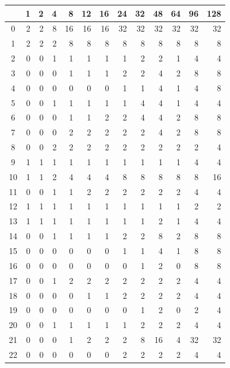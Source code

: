 \documentclass[11pt,a4paper,openright,twoside]{book}
\numberwithin{equation}{section} %
\numberwithin{figure}{section} %
\numberwithin{table}{section} %
\begin{document}
\begin{table}[ht]
	\centering
	\small
	\def\arraystretch{0.85}
	\begin{tabular}{c|rrrrrrrrrrrr}
		\diagbox{\acs{IPM}}{System} &
		1 & 2 & 4 & 8  & 12 & 16 & 24 & 32 & 48 & 64 & 96 & 128 \\
		\hline
		0 & 2 & 2 & 8 & 16 & 16 & 16 & 32 & 32 & 32 & 32 & 32 & 32 \\
		1 & 2 & 2 & 2 & 8  & 8  & 8  & 8  & 8  & 8  & 8  & 8  & 8 \\
		2 & 0 & 0 & 1 & 1  & 1  & 1  & 1  & 2  & 2  & 1  & 4  & 4 \\
		3 & 0 & 0 & 0 & 1  & 1  & 1  & 2  & 2  & 4  & 2  & 8  & 8 \\
		4 & 0 & 0 & 0 & 0  & 0  & 0  & 1  & 1  & 4  & 1  & 4  & 8 \\
		5 & 0 & 0 & 1 & 1  & 1  & 1  & 1  & 4  & 4  & 1  & 4  & 4 \\
		6 & 0 & 0 & 0 & 1  & 1  & 2  & 2  & 4  & 4  & 2  & 8  & 8 \\
		7 & 0 & 0 & 0 & 2  & 2  & 2  & 2  & 2  & 4  & 2  & 8  & 8 \\
		8 & 0 & 0 & 2 & 2  & 2  & 2  & 2  & 2  & 2  & 2  & 2  & 4 \\
		9 & 1 & 1 & 1 & 1  & 1  & 1  & 1  & 1  & 1  & 1  & 4  & 4 \\
		10 & 1 & 1 & 2 & 4  & 4  & 4  & 8  & 8  & 8  & 8  & 8  & 16 \\
		11 & 0 & 0 & 1 & 1  & 2  & 2  & 2  & 2  & 2  & 2  & 4  & 4 \\
		12 & 1 & 1 & 1 & 1  & 1  & 1  & 1  & 1  & 1  & 1  & 2  & 2 \\
		13 & 1 & 1 & 1 & 1  & 1  & 1  & 1  & 1  & 2  & 1  & 4  & 4 \\
		14 & 0 & 0 & 1 & 1  & 1  & 1  & 2  & 2  & 8  & 2  & 8  & 8 \\
		15 & 0 & 0 & 0 & 0  & 0  & 0  & 1  & 1  & 4  & 1  & 8  & 8 \\
		16 & 0 & 0 & 0 & 0  & 0  & 0  & 0  & 1  & 2  & 0  & 8  & 8 \\
		17 & 0 & 0 & 1 & 2  & 2  & 2  & 2  & 2  & 2  & 2  & 4  & 4 \\
		18 & 0 & 0 & 0 & 0  & 1  & 1  & 2  & 2  & 2  & 2  & 4  & 4 \\
		19 & 0 & 0 & 0 & 0  & 0  & 0  & 0  & 1  & 2  & 0  & 2  & 4 \\
		20 & 0 & 0 & 1 & 1  & 1  & 1  & 1  & 2  & 2  & 2  & 4  & 4 \\
		21 & 0 & 0 & 0 & 1  & 2  & 2  & 2  & 8  & 16 & 4  & 32 & 32 \\
		22 & 0 & 0 & 0 & 0  & 0  & 0  & 2  & 2  & 2  & 2  & 4  & 4 \\

\end{tabular}
\end{table}
\end{document}
